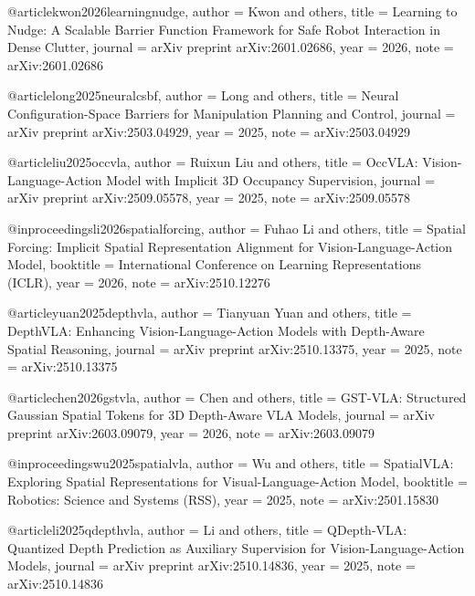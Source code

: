 @article{kwon2026learningnudge,
  author    = {Kwon and others},
  title     = {Learning to Nudge: A Scalable Barrier Function Framework for Safe Robot Interaction in Dense Clutter},
  journal   = {arXiv preprint arXiv:2601.02686},
  year      = {2026},
  note      = {arXiv:2601.02686}
}

@article{long2025neuralcsbf,
  author    = {Long and others},
  title     = {Neural Configuration-Space Barriers for Manipulation Planning and Control},
  journal   = {arXiv preprint arXiv:2503.04929},
  year      = {2025},
  note      = {arXiv:2503.04929}
}


@article{liu2025occvla,
  author    = {Ruixun Liu and others},
  title     = {{OccVLA}: Vision-Language-Action Model with Implicit 3D Occupancy Supervision},
  journal   = {arXiv preprint arXiv:2509.05578},
  year      = {2025},
  note      = {arXiv:2509.05578}
}

@inproceedings{li2026spatialforcing,
  author    = {Fuhao Li and others},
  title     = {Spatial Forcing: Implicit Spatial Representation Alignment for Vision-Language-Action Model},
  booktitle = {International Conference on Learning Representations (ICLR)},
  year      = {2026},
  note      = {arXiv:2510.12276}
}

@article{yuan2025depthvla,
  author    = {Tianyuan Yuan and others},
  title     = {{DepthVLA}: Enhancing Vision-Language-Action Models with Depth-Aware Spatial Reasoning},
  journal   = {arXiv preprint arXiv:2510.13375},
  year      = {2025},
  note      = {arXiv:2510.13375}
}

@article{chen2026gstvla,
  author    = {Chen and others},
  title     = {{GST-VLA}: Structured {Gaussian} Spatial Tokens for 3D Depth-Aware {VLA} Models},
  journal   = {arXiv preprint arXiv:2603.09079},
  year      = {2026},
  note      = {arXiv:2603.09079}
}

@inproceedings{wu2025spatialvla,
  author    = {Wu and others},
  title     = {{SpatialVLA}: Exploring Spatial Representations for Visual-Language-Action Model},
  booktitle = {Robotics: Science and Systems (RSS)},
  year      = {2025},
  note      = {arXiv:2501.15830}
}

@article{li2025qdepthvla,
  author    = {Li and others},
  title     = {{QDepth-VLA}: Quantized Depth Prediction as Auxiliary Supervision for Vision-Language-Action Models},
  journal   = {arXiv preprint arXiv:2510.14836},
  year      = {2025},
  note      = {arXiv:2510.14836}
}

